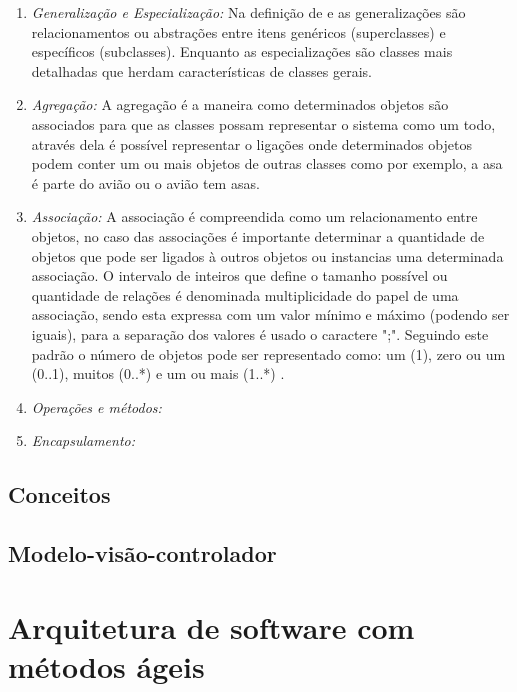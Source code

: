 \begin{enumerate}
\item \textit{Generalização e Especialização:} Na definição de \cite{rumbaugh1991object} e \cite{booch2005unified} as generalizações são relacionamentos ou abstrações entre itens genéricos (superclasses) e específicos (subclasses). Enquanto as especializações são classes mais detalhadas que herdam características de classes gerais.

\item \textit{Agregação:} A agregação é a maneira como determinados objetos são associados para que as classes possam representar o sistema como um todo, através dela é possível representar o ligações onde determinados objetos podem conter um ou mais objetos de outras classes como por exemplo, a asa é parte do avião ou o avião tem asas.

\item \textit{Associação:} A associação é compreendida como um relacionamento entre objetos, no caso das associações é importante determinar a quantidade de objetos que pode ser ligados à outros objetos ou instancias uma determinada associação. O intervalo de inteiros que define o tamanho possível ou quantidade de relações é denominada multiplicidade do papel de uma associação, sendo esta expressa com um valor mínimo e máximo (podendo ser iguais), para a separação dos valores é usado o caractere ";". Seguindo este padrão o número de objetos pode ser representado como: um (1), zero ou um (0..1), muitos (0..*) e um ou mais (1..*) \cite{rumbaugh1991object}.


\item \textit{Operações e métodos:}
\item \textit{Encapsulamento:}



\end{enumerate}

\subsection{Conceitos }


\subsection{Modelo-visão-controlador}


\section{Arquitetura de software com métodos ágeis}

